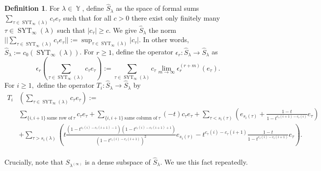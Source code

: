\documentclass[12pt,reqno]{amsart}
\theoremstyle{definition}
\newtheorem{defn}[thm]{Definition}
\DeclareMathOperator{\SYT}{\mathrm{SYT}}
\DeclareMathOperator{\Par}{\mathbb{Y}}
\begin{document}
\begin{defn}\label{defn inf specht module closure}
    For $\lambda \in \Par$, define  $\hat{S}_{\lambda}$ as the space of formal sums $\sum_{\tau \in \SYT_{\infty}(\lambda)} c_{\tau} e_{\tau}$ such that for all $c > 0$ there exist only finitely many $\tau \in \SYT_{\infty}(\lambda)$ such that $|c_{\tau}| \geq c$. We give $\hat{S}_{\lambda}$ the norm $||\sum_{\tau \in \SYT_{\infty}(\lambda)} c_{\tau} e_{\tau} ||:= \sup_{\tau \in \SYT_{\infty}(\lambda)} |c_{\tau}|.$ In other words, $\hat{S}_{\lambda}:= c_{0}(\SYT_{\infty}(\lambda))$. For $r \geq 1$, define the operator $\epsilon_r: \hat{S}_{\lambda} \rightarrow \hat{S}_{\lambda}$ as 
    $$\epsilon_{r}\left( \sum_{\tau \in \SYT_{\infty}(\lambda)} c_{\tau} e_{\tau}\right):= \sum_{\tau \in \SYT_{\infty}(\lambda) } c_{\tau} \lim_{m \rightarrow \infty }\epsilon_{r}^{(r+ m)}(e_{\tau}).$$ For $i \geq 1,$ define the operator $T_i: \hat{S}_{\lambda} \rightarrow \hat{S}_{\lambda}$ by 
    \begin{align*}
        T_i&\left( \sum_{\tau \in \SYT_{\infty}(\lambda)} c_{\tau} e_{\tau} \right):= \\
        & \sum_{\{i,i+1 \} ~ \text{same row of} ~ \tau } c_{\tau}e_{\tau} + \sum_{\{i,i+1 \} ~ \text{same column of}~ \tau} (-t)c_{\tau}e_{\tau}+ \sum_{\tau< s_i(\tau)}  \left( e_{s_{i}(\tau)} + \frac{1-t}{1-t^{c_{\tau}(i+1)-c_{\tau}(i)}} e_{\tau} \right)\\
        &+ \sum_{\tau > s_{i}(\lambda)}\left( t\frac{(1-t^{c_{\tau}(i) - c_{\tau}(i+1) -1})(1-t^{c_{\tau}(i)-c_{\tau}(i+1)+1})}{(1-t^{c_{\tau}(i)-c_{\tau}(i+1)})^2} e_{s_{i}(\tau)} - t^{c_{\tau}(i)-c_{\tau}(i+1)} \frac{1-t}{1-t^{c_{\tau}(i)-c_{\tau}(i+1)}}e_{\tau} \right).\\
    \end{align*}
\end{defn}

Crucially, note that $S_{\lambda^{(\infty)}}$ is a dense subspace of $\hat{S}_{\lambda}.$ We use this fact repeatedly.
\end{document}
